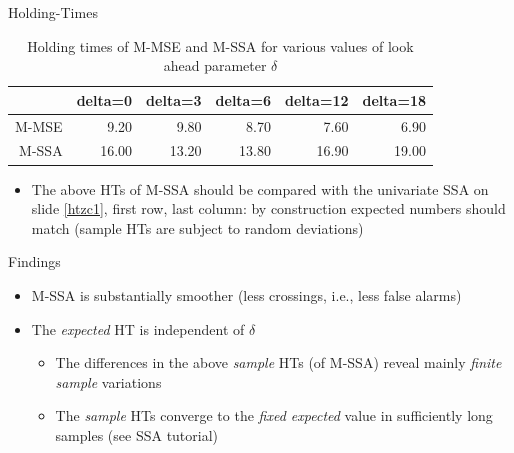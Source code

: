 \documentclass{beamer}
\begin{document}
\begin{frame} {Holding-Times}\label{htzc2}



\begin{table}[ht]
\centering
\begin{tabular}{rrrrrr}
  \hline
 & delta=0 & delta=3 & delta=6 & delta=12 & delta=18 \\ 
  \hline
M-MSE & 9.20 & 9.80 & 8.70 & 7.60 & 6.90 \\ 
  M-SSA & 16.00 & 13.20 & 13.80 & 16.90 & 19.00 \\ 
   \hline
\end{tabular}
\caption{Holding times of M-MSE and M-SSA for various values of look ahead parameter $\delta$} 
\label{perf_var1}
\end{table}\begin{itemize}
\item The above HTs of M-SSA should be compared with the univariate SSA on slide \eqref{htzc1}, first row, last column: by construction expected numbers should match (sample HTs are subject to random deviations)

\end{itemize}

\end{frame}



\begin{frame} {Findings}
\begin{itemize}
\item M-SSA is substantially smoother (less crossings, i.e., less false alarms)
\item The \emph{expected} HT is independent of $\delta$ 
\begin{itemize}
\item The differences in the above \emph{sample} HTs (of M-SSA) reveal mainly \emph{finite sample} variations
\item The \emph{sample} HTs converge to the  \emph{fixed expected} value in sufficiently long samples (see SSA tutorial)
\end{itemize}


\end{itemize}

\end{frame}
\end{document}
